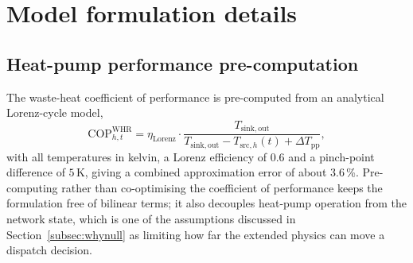 
\section{Model formulation details}
\label{app:model_details}

\subsection{Heat-pump performance pre-computation}
\label{app:cop}

The waste-heat coefficient of performance is pre-computed from an analytical Lorenz-cycle
model,
%
\begin{equation}
  \mathrm{COP}_{h,t}^{\mathrm{WHR}} = \eta_{\mathrm{Lorenz}}
  \cdot \frac{T_{\mathrm{sink,out}}}{T_{\mathrm{sink,out}} -
  T_{\mathrm{src},h}(t) + \Delta T_{\mathrm{pp}}},
\end{equation}
%
with all temperatures in kelvin, a Lorenz efficiency of $0.6$ and a pinch-point difference of $5$\,K, giving a combined
approximation error of about $3.6$\,\%. Pre-computing rather than co-optimising the
coefficient of performance keeps the formulation free of bilinear terms; it also decouples
heat-pump operation from the network state, which is one of the assumptions discussed in
Section~\ref{subsec:whynull} as limiting how far the extended physics can move a dispatch
decision.

